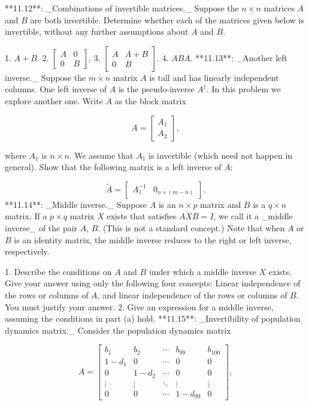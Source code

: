 

**11.12**: _Combinations of invertible matrices._ Suppose the \(n\times n\) matrices \(A\) and \(B\) are both invertible. Determine whether each of the matrices given below is invertible, without any further assumptions about \(A\) and \(B\).

1. \(A+B\).
2. \(\left[\begin{array}{cc}A&0\\ 0&B\end{array}\right]\).
3. \(\left[\begin{array}{cc}A&A+B\\ 0&B\end{array}\right]\).
4. \(ABA\).
**11.13**: _Another left inverse._ Suppose the \(m\times n\) matrix \(A\) is tall and has linearly independent columns. One left inverse of \(A\) is the pseudo-inverse \(A^{\dagger}\). In this problem we explore another one. Write \(A\) as the block matrix

\[A=\left[\begin{array}{c}A_{1}\\ A_{2}\end{array}\right],\]

where \(A_{1}\) is \(n\times n\). We assume that \(A_{1}\) is invertible (which need not happen in general). Show that the following matrix is a left inverse of \(A\):

\[\tilde{A}=\left[\begin{array}{cc}A_{1}^{-1}&0_{n\times(m-n)}\end{array} \right].\]
**11.14**: _Middle inverse._ Suppose \(A\) is an \(n\times p\) matrix and \(B\) is a \(q\times n\) matrix. If a \(p\times q\) matrix \(X\) exists that satisfies \(AXB=I\), we call it a _middle inverse_ of the pair \(A\), \(B\). (This is not a standard concept.) Note that when \(A\) or \(B\) is an identity matrix, the middle inverse reduces to the right or left inverse, respectively.

1. Describe the conditions on \(A\) and \(B\) under which a middle inverse \(X\) exists. Give your answer using only the following four concepts: Linear independence of the rows or columns of \(A\), and linear independence of the rows or columns of \(B\). You must justify your answer.
2. Give an expression for a middle inverse, assuming the conditions in part (a) hold.
**11.15**: _Invertibility of population dynamics matrix._ Consider the population dynamics matrix

\[A=\left[\begin{array}{cccccc}b_{1}&b_{2}&\cdots&b_{99}&b_{100}\\ 1-d_{1}&0&\cdots&0&0\\ 0&1-d_{2}&\cdots&0&0\\ \vdots&\vdots&\ddots&\vdots&\vdots\\ 0&0&\cdots&1-d_{99}&0\end{array}\right],\]

